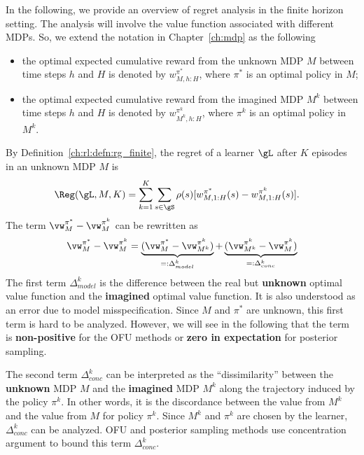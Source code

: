 In the following, we provide an overview of regret analysis in the finite horizon setting. 
The analysis will involve the value function associated with different MDPs.
So, we extend the notation in Chapter~\ref{ch:mdp} as the following
\begin{itemize}
    \item the optimal expected cumulative reward from the unknown MDP $M$ between time steps $h$ and $H$ is denoted by $w^{\pi^*}_{M,h:H}$, where $\pi^*$ is an optimal policy in $M$;
    \item the optimal expected cumulative reward from the imagined MDP $M^k$ between time steps $h$ and $H$ is denoted by $w^{\pi^k}_{M^k,h:H}$, where $\pi^k$ is an optimal policy in $M^k$.
\end{itemize}

By Definition~\ref{ch:rl:defn:rg_finite}, the regret of a learner $\gL$ after $K$ episodes in an unknown MDP $M$ is
\begin{align*}
    \Reg(\gL, M, K) &= \sum_{k=1}^K\sum_{s\in\gS}\rho(s)[w^{\pi^*}_{M,1:H}(s) -w^{\pi^k}_{M,1:H}(s)].
\end{align*}
The term $\vw^{\pi^*}_M -\vw^{\pi^k}_M$ can be rewritten as
\begin{equation}
    \label{eq:rg_model_conc}
    \vw^{\pi^*}_M -\vw^{\pi^k}_M = \underbrace{(\vw^{\pi^*}_M -\vw^{\pi^k}_{M^k})}_{=:\Delta_{model}^k} +\underbrace{(\vw^{\pi^k}_{M^k} -\vw^{\pi^k}_M)}_{=:\Delta_{conc}^k}
\end{equation}
The first term $\Delta_{model}^k$ is the difference between the real but \textbf{unknown} optimal value function and the \textbf{imagined} optimal value function.
It is also understood as an error due to model misspecification.
Since $M$ and $\pi^*$ are unknown, this first term is hard to be analyzed.
However, we will see in the following that the term is \textbf{non-positive} for the OFU methods or \textbf{zero in expectation} for posterior sampling.

The second term $\Delta_{conc}^k$ can be interpreted as the ``dissimilarity'' between the \textbf{unknown} MDP $M$ and the \textbf{imagined} MDP $M^k$ along the trajectory induced by the policy $\pi^k$.
In other words, it is the discordance between the value from $M^k$ and the value from $M$ for policy $\pi^k$.
Since $M^k$ and $\pi^k$ are chosen by the learner, $\Delta_{conc}^k$ can be analyzed.
OFU and posterior sampling methods use concentration argument to bound this term $\Delta_{conc}^k$.

